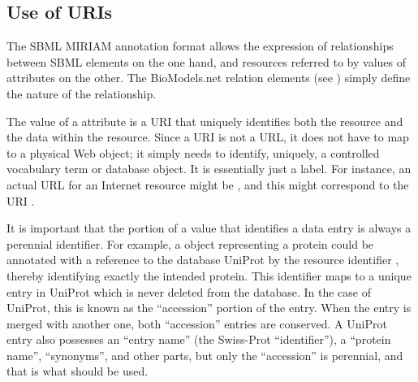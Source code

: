 

\vspace*{-1.75ex}
\subsection{Use of URIs}
\label{sec:uri-in-annotation}

The SBML MIRIAM annotation format allows the expression of
relationships between SBML elements on the one hand, and resources
referred to by values of  attributes on the
other.  The BioModels.net relation elements (see
) simply define the
nature of the relationship.

The value of a  attribute is a URI that
uniquely identifies both the resource and the data within the
resource.  Since a URI is not a URL, it does not have to map to a
physical Web object; it simply needs to identify, uniquely, a
controlled vocabulary term or database object.  It is essentially
just a label.  For instance, an actual URL for an Internet
resource might be , and
this might correspond to the URI  \citep{juty:2012}.

It is important that the portion of a  value
that identifies a data entry is always a perennial identifier.
For example, a \Species object representing a protein could be
annotated with a reference to the database UniProt by the resource
identifier , thereby identifying
exactly the intended protein.  This identifier maps to a unique
entry in UniProt which is never deleted from the database.  In the
case of UniProt, this is known as the ``accession'' portion of the
entry.  When the entry is merged with another one, both
``accession'' entries are conserved.  A UniProt entry also
possesses an ``entry name'' (the Swiss-Prot ``identifier''), a
``protein name'', ``synonyms'', and other parts, but only the
``accession'' is perennial, and that is what should be used.

